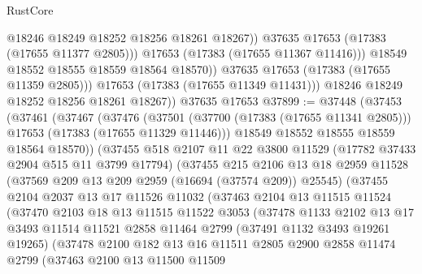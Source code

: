 \begin{lexlean}{RustCore}
\begin{coremodule}
                        @18246
                        @18249
                        @18252
                        @18256
                        @18261
                        @18267))
                    @37635
                    @17653
                    (@17383 (@17655 @11377 @2805)))
                  @17653
                  (@17383 (@17655 @11367 @11416)))
                @18549
                @18552
                @18555
                @18559
                @18564
                @18570))
            @37635
            @17653
            (@17383 (@17655 @11359 @2805)))
          @17653
          (@17383 (@17655 @11349 @11431)))
        @18246
        @18249
        @18252
        @18256
        @18261
        @18267))
    @37635
    @17653
@37899 := @37448
    (@37453
      (@37461
        (@37467
          (@37476
            (@37501 (@37700 (@17383 (@17655 @11341 @2805))) @17653 (@17383 (@17655 @11329 @11446)))
            @18549
            @18552
            @18555
            @18559
            @18564
            @18570))
        (@37455
          @518
          @2107
          @11
          @22
          @3800
          @11529
          (@17782 @37433 @2904 @515 @11 @3799 @17794)
          (@37455
            @215
            @2106
            @13
            @18
            @2959
            @11528
            (@37569 @209 @13 @209 @2959 (@16694 (@37574 @209)) @25545)
            (@37455
              @2104
              @2037
              @13
              @17
              @11526
              @11032
              (@37463
                @2104
                @13
                @11515
                @11524
                (@37470
                  @2103
                  @18
                  @13
                  @11515
                  @11522
                  @3053
                  (@37478
                    @1133
                    @2102
                    @13
                    @17
                    @3493
                    @11514
                    @11521
                    @2858
                    @11464
                    @2799
                    (@37491 @1132 @3493 @19261 @19265)
                    (@37478
                      @2100
                      @182
                      @13
                      @16
                      @11511
                      @2805
                      @2900
                      @2858
                      @11474
                      @2799
                      (@37463
                        @2100
                        @13
                        @11500
                        @11509

\end{coremodule}
\end{lexlean}
